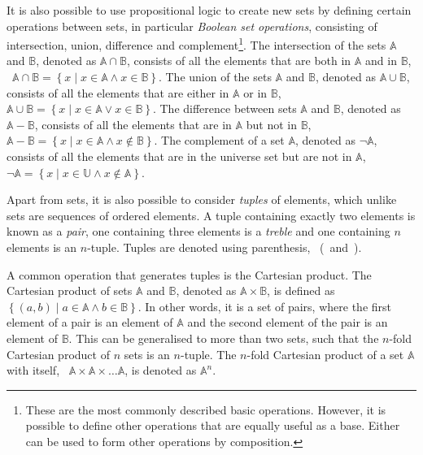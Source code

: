 It is also possible to use propositional logic to create new sets by defining certain operations between sets, in particular \emph{Boolean set operations}, consisting of intersection, union, difference and complement\footnote{These are the most commonly described basic operations. However, it is possible to define other operations that are equally useful as a base. Either can be used to form other operations by composition.}.
The intersection of the sets $\mathbb{A}$ and $\mathbb{B}$, denoted as $\mathbb{A} \cap \mathbb{B}$, consists of all the elements that are both in $\mathbb{A}$ and in $\mathbb{B}$, \ie\ $\mathbb{A} \cap \mathbb{B} = \left\{ x \mid x \in \mathbb{A} \wedge x \in \mathbb{B} \right\}$.
The union of the sets $\mathbb{A}$ and $\mathbb{B}$, denoted as $\mathbb{A} \cup \mathbb{B}$, consists of all the elements that are either in $\mathbb{A}$ or in $\mathbb{B}$, \ie\ $\mathbb{A} \cup \mathbb{B} = \left\{ x \mid x \in \mathbb{A} \vee x \in \mathbb{B} \right\}$.
The difference between sets $\mathbb{A}$ and $\mathbb{B}$, denoted as $\mathbb{A} - \mathbb{B}$, consists of all the elements that are in $\mathbb{A}$ but not in $\mathbb{B}$, \ie\ $\mathbb{A} - \mathbb{B} = \left\{ x \mid x \in \mathbb{A} \wedge x \notin \mathbb{B} \right\}$.
The complement of a set $\mathbb{A}$, denoted as $\neg \mathbb{A}$, consists of all the elements that are in the universe set but are not in $\mathbb{A}$, \ie\ $\neg \mathbb{A} = \left\{ x \mid x \in \mathbb{U} \wedge x \notin \mathbb{A} \right\}$.

Apart from sets, it is also possible to consider \emph{tuples} of elements, which unlike sets are sequences of ordered elements.
A tuple containing exactly two elements is known as a \emph{pair}, one containing three elements is a \emph{treble} and one containing $n$ elements is an $n$-tuple.
Tuples are denoted using parenthesis, \ie\ (\ and~).

A common operation that generates tuples is the Cartesian product.
The Cartesian product of sets $\mathbb{A}$ and $\mathbb{B}$, denoted as $\mathbb{A} \times \mathbb{B}$, is defined as $\left\{ (a,b) \mid a \in \mathbb{A} \wedge b \in \mathbb{B} \right\}$.
In other words, it is a set of pairs, where the first element of a pair is an element of $\mathbb{A}$ and the second element of the pair is an element of $\mathbb{B}$.
This can be generalised to more than two sets, such that the $n$-fold Cartesian product of $n$ sets is an $n$-tuple.
The $n$-fold Cartesian product of a set $\mathbb{A}$ with itself, \ie\ $\mathbb{A} \times \mathbb{A} \times \ldots \mathbb{A}$, is denoted as $\mathbb{A}^n$.

